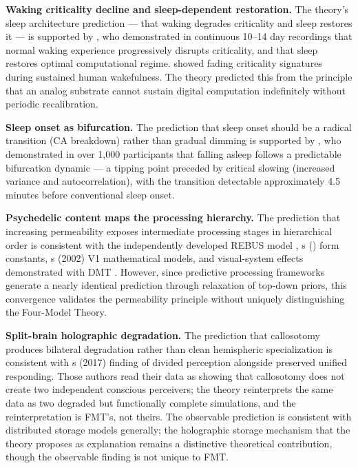 \documentclass[12pt]{article}
\begin{document}
\textbf{Waking criticality decline and sleep-dependent restoration.} The theory's sleep architecture prediction --- that waking degrades criticality and sleep restores it --- is supported by \citet{Xu2024}, who demonstrated in continuous 10--14 day recordings that normal waking experience progressively disrupts criticality, and that sleep restores optimal computational regime. \citet{Meisel2013} showed fading criticality signatures during sustained human wakefulness. The theory predicted this from the principle that an analog substrate cannot sustain digital computation indefinitely without periodic recalibration.

\textbf{Sleep onset as bifurcation.} The prediction that sleep onset should be a radical transition (CA breakdown) rather than gradual dimming is supported by \citet{Li2025}, who demonstrated in over 1,000 participants that falling asleep follows a predictable bifurcation dynamic --- a tipping point preceded by critical slowing (increased variance and autocorrelation), with the transition detectable approximately 4.5 minutes before conventional sleep onset.

\textbf{Psychedelic content maps the processing hierarchy.} The prediction that increasing permeability exposes intermediate processing stages in hierarchical order is consistent with the independently developed REBUS model \citep{CarhartHarris2019}, \citeauthor{Kluver1966}\textquotesingle s (\citeyear{Kluver1966}) form constants, \citeauthor{Bressloff2002}\textquotesingle s (2002) V1 mathematical models, and visual-system effects demonstrated with DMT \citep{Timmermann2023}. However, since predictive processing frameworks generate a nearly identical prediction through relaxation of top-down priors, this convergence validates the permeability principle without uniquely distinguishing the Four-Model Theory.

\textbf{Split-brain holographic degradation.} The prediction that callosotomy produces bilateral degradation rather than clean hemispheric specialization is consistent with \citeauthor{Pinto2017}\textquotesingle s (2017) finding of divided perception alongside preserved unified responding. Those authors read their data as showing that callosotomy does not create two independent conscious perceivers; the theory reinterprets the same data as two degraded but functionally complete simulations, and the reinterpretation is FMT's, not theirs. The observable prediction is consistent with distributed storage models generally; the holographic storage mechanism that the theory proposes as explanation remains a distinctive theoretical contribution, though the observable finding is not unique to FMT.
\end{document}
